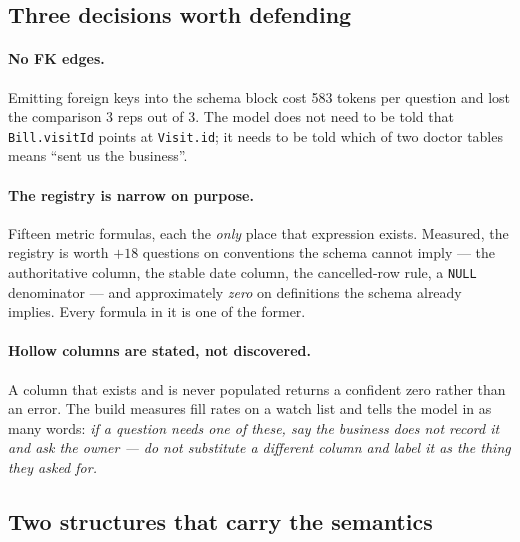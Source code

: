 \documentclass[11pt,a4paper]{report}
\newcommand{\code}[1]{\texttt{\small #1}}
\begin{document}
\subsection{Three decisions worth defending}

\paragraph{No FK edges.} Emitting foreign keys into the schema block cost 583 tokens per question
and lost the comparison 3 reps out of 3. The model does not need to be told that
\code{Bill.visitId} points at \code{Visit.id}; it needs to be told which of two doctor tables means
``sent us the business''.

\paragraph{The registry is narrow on purpose.} Fifteen metric formulas, each the \emph{only} place
that expression exists. Measured, the registry is worth $+18$ questions on conventions the schema
cannot imply --- the authoritative column, the stable date column, the cancelled-row rule, a
\code{NULL} denominator --- and approximately \emph{zero} on definitions the schema already
implies. Every formula in it is one of the former.

\paragraph{Hollow columns are stated, not discovered.} A column that exists and is never populated
returns a confident zero rather than an error. The build measures fill rates on a watch list and
tells the model in as many words: \emph{if a question needs one of these, say the business does not
record it and ask the owner --- do not substitute a different column and label it as the thing they
asked for.}

\subsection{Two structures that carry the semantics}
\end{document}
